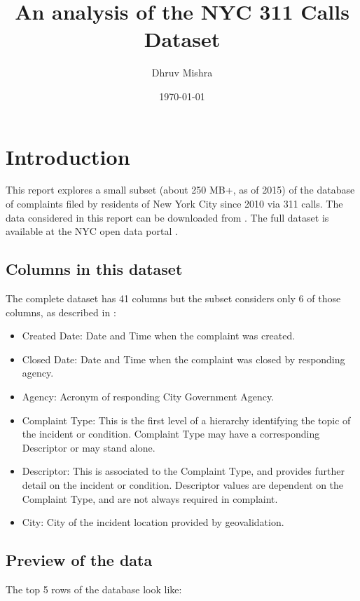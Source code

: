 \documentclass[12pt,a4paper]{article}
\begin{document}
\title{An analysis of the NYC 311 Calls Dataset}
\author{Dhruv Mishra}
\date{\today}

\maketitle


\vspace{+10mm}
\tableofcontents


\vspace{+10mm}
\section{Introduction}
This report explores a small subset (about 250 MB+, as of 2015) of the database of complaints filed by residents of New York City since 2010 via 311 calls. The data considered in this report can be downloaded from \cite{subset}. The full dataset is available at the NYC open data portal \cite{nycdatafull}.

\subsection{Columns in this dataset}
The complete dataset has 41 columns but the subset considers only 6 of those columns, as described in \cite{nycdatafull}:
\begin{itemize}
    \item Created Date: Date and Time when the complaint was created.
    \item Closed Date: Date and Time when the complaint was closed by responding agency.
    \item Agency: Acronym of responding City Government Agency.
    \item Complaint Type: This is the first level of a hierarchy identifying the topic of the incident or condition. Complaint Type may have a corresponding Descriptor or may stand alone.
    \item Descriptor: This is associated to the Complaint Type, and provides further detail on the incident or condition. Descriptor values are dependent on the Complaint Type, and are not always required in complaint.
    \item City: City of the incident location provided by geovalidation.
\end{itemize}

\subsection{Preview of the data}
The top 5 rows of the database look like:
\end{document}

